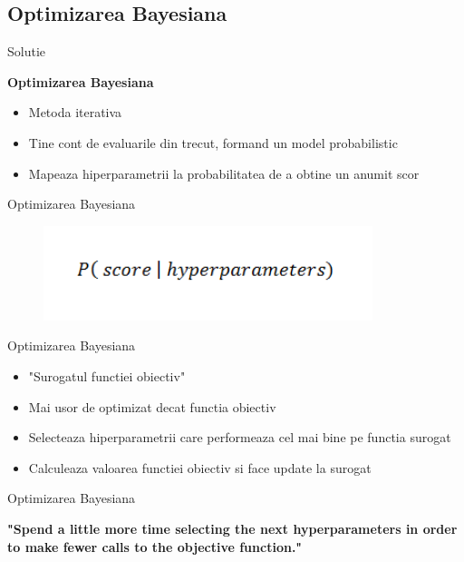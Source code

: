 \documentclass{beamer}
\begin{document}
\subsection{Optimizarea Bayesiana}
\begin{frame}{Solutie}
	\begin{center}
		\textbf{Optimizarea Bayesiana}
	\end{center}
		\begin{itemize}
			\item Metoda iterativa
			\item Tine cont de evaluarile din trecut, formand un model probabilistic 
			\item Mapeaza hiperparametrii la probabilitatea de a obtine un anumit scor
		\end{itemize}
\end{frame}

\begin{frame}{Optimizarea Bayesiana}
	\begin{figure}[H]
		\centering
		\includegraphics[scale=0.75]{prob.PNG}
	\end{figure}
\end{frame}

\begin{frame}{Optimizarea Bayesiana}
	\begin{itemize}
		\item "Surogatul functiei obiectiv"
		\item Mai usor de optimizat decat functia obiectiv
		\item Selecteaza hiperparametrii care performeaza cel mai bine pe functia surogat
		\item Calculeaza valoarea functiei obiectiv si face update la surogat
	\end{itemize}
\end{frame}

\begin{frame}{Optimizarea Bayesiana}
	\begin{center}
		\textbf{"Spend a little more time selecting the next hyperparameters in order to make fewer calls to the objective function."}
	\end{center}	
\end{frame}
\end{document}
